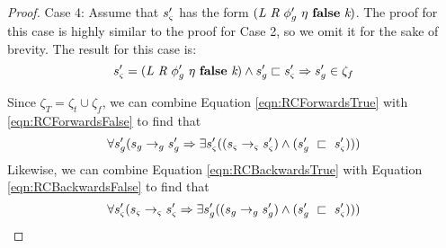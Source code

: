 \begin{proof}
Case 4: Assume that $s_{\varsigma}^\prime$ has the form $\lp \cfgnt{L}\ \cfgnt{R}\ \phi_g^\prime\ \eta\ \cfgt{false}\ \cfgnt{k}\rp $.
The proof for this case is highly similar to the proof for Case 2, so we omit it for the sake of brevity. The result for this case is:
\begin{equation}
\label{eqn:RCBackwardsFalse}
s_\sym^\prime=\lp \cfgnt{L}\ \cfgnt{R}\ \phi_g^\prime\ \eta\ \cfgt{false}\ \cfgnt{k}\rp \wedge s_\gse^\prime \sqsubset s_\sym^\prime \Rightarrow s_\gse^\prime \in \zeta_f
\end{equation}

Since $\zeta_T = \zeta_t \cup \zeta_f$, we can combine Equation \ref{eqn:RCForwardsTrue} with \ref{eqn:RCForwardsFalse} to find that 
\begin{equation}
\forall s_{g}^\prime ( s_{g} \rightarrow_{g} s_{g}^\prime \Rightarrow \exists s_{\varsigma}^\prime( (s_{\varsigma} \rightarrow_{\varsigma} s_{\varsigma}^\prime )\wedge (s_{g}^\prime\ \sqsubset\ s_{\varsigma}^\prime ))  )
\end{equation}
Likewise, we can combine Equation \ref{eqn:RCBackwardsTrue} with Equation \ref{eqn:RCBackwardsFalse} to find that
\begin{equation}
\forall s_{\varsigma}^\prime ( s_{\varsigma} \rightarrow_{\varsigma} s_{\varsigma}^\prime\Rightarrow \exists s_{g}^\prime( (s_{g} \rightarrow_{g} s_{g}^\prime )\wedge (s_{g}^\prime\ \sqsubset\ s_{\varsigma}^\prime ))  )
\end{equation}
\end{proof}



%



